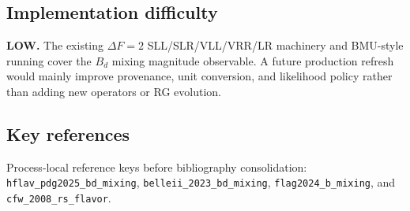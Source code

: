 \subsection*{Implementation difficulty}
\textbf{LOW.}  The existing \(\Delta F=2\) SLL/SLR/VLL/VRR/LR machinery and
BMU-style running cover the \(B_d\) mixing magnitude observable.  A future
production refresh would mainly improve provenance, unit conversion, and
likelihood policy rather than adding new operators or RG evolution.

\subsection*{Key references}
Process-local reference keys before bibliography consolidation:
\texttt{hflav\_pdg2025\_bd\_mixing},
\texttt{belleii\_2023\_bd\_mixing},
\texttt{flag2024\_b\_mixing}, and
\texttt{cfw\_2008\_rs\_flavor}.
